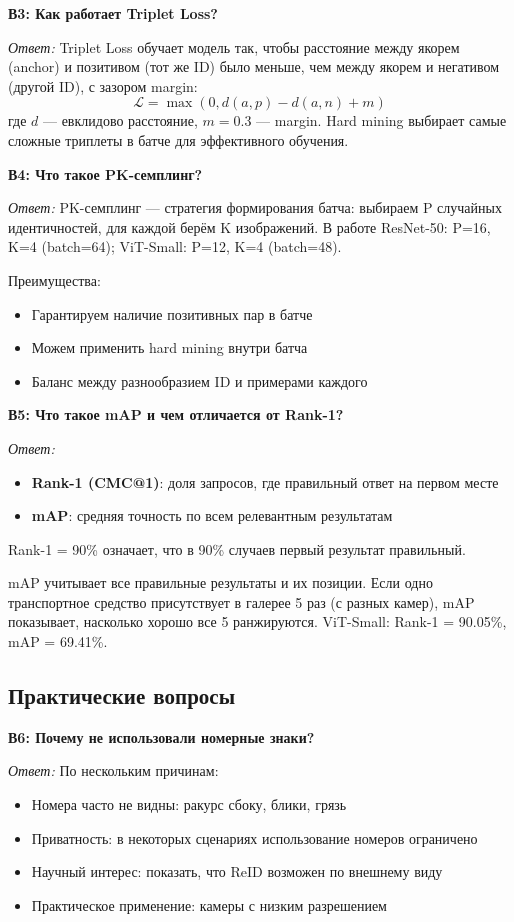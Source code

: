 \documentclass[a4paper, 12pt]{article}
\begin{document}
\vspace{1em}
\textbf{В3: Как работает Triplet Loss?}

\textit{Ответ:} Triplet Loss обучает модель так, чтобы расстояние между якорем (anchor) и позитивом (тот же ID) было меньше, чем между якорем и негативом (другой ID), с зазором margin:
$$\mathcal{L} = \max(0, d(a,p) - d(a,n) + m)$$
где $d$ --- евклидово расстояние, $m=0.3$ --- margin. Hard mining выбирает самые сложные триплеты в батче для эффективного обучения.

\vspace{1em}
\textbf{В4: Что такое PK-семплинг?}

\textit{Ответ:} PK-семплинг --- стратегия формирования батча: выбираем P случайных идентичностей, для каждой берём K изображений. В работе ResNet-50: P=16, K=4 (batch=64); ViT-Small: P=12, K=4 (batch=48).

Преимущества:
\begin{itemize}
  \item Гарантируем наличие позитивных пар в батче
  \item Можем применить hard mining внутри батча
  \item Баланс между разнообразием ID и примерами каждого
\end{itemize}

\vspace{1em}
\textbf{В5: Что такое mAP и чем отличается от Rank-1?}

\textit{Ответ:}
\begin{itemize}
  \item \textbf{Rank-1 (CMC@1)}: доля запросов, где правильный ответ на первом месте
  \item \textbf{mAP}: средняя точность по всем релевантным результатам
\end{itemize}
Rank-1 = 90\% означает, что в 90\% случаев первый результат правильный.

mAP учитывает все правильные результаты и их позиции. Если одно транспортное средство присутствует в галерее 5 раз (с разных камер), mAP показывает, насколько хорошо все 5 ранжируются. ViT-Small: Rank-1 = 90.05\%, mAP = 69.41\%.

\subsection*{Практические вопросы}

\textbf{В6: Почему не использовали номерные знаки?}

\textit{Ответ:} По нескольким причинам:
\begin{itemize}
  \item Номера часто не видны: ракурс сбоку, блики, грязь
  \item Приватность: в некоторых сценариях использование номеров ограничено
  \item Научный интерес: показать, что ReID возможен по внешнему виду
  \item Практическое применение: камеры с низким разрешением
\end{itemize}
\end{document}
